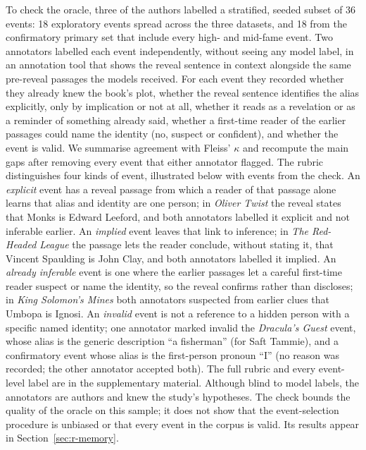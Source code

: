 \documentclass[sn-mathphys]{sn-jnl}%
\theoremstyle{thmstyleone}%
\theoremstyle{thmstyletwo}%
\theoremstyle{thmstylethree}%
\begin{document}
To check the oracle, three of the authors labelled a stratified, seeded subset of 36 events: 18 exploratory events spread across the three datasets, and 18 from the confirmatory primary set that include every high- and mid-fame event. Two annotators labelled each event independently, without seeing any model label, in an annotation tool that shows the reveal sentence in context alongside the same pre-reveal passages the models received. For each event they recorded whether they already knew the book's plot, whether the reveal sentence identifies the alias explicitly, only by implication or not at all, whether it reads as a revelation or as a reminder of something already said, whether a first-time reader of the earlier passages could name the identity (no, suspect or confident), and whether the event is valid. We summarise agreement with Fleiss' $\kappa$ \cite{fleiss1971measuring} and recompute the main gaps after removing every event that either annotator flagged. The rubric distinguishes four kinds of event, illustrated below with events from the check. An \emph{explicit} event has a reveal passage from which a reader of that passage alone learns that alias and identity are one person; in \emph{Oliver Twist} the reveal states that Monks is Edward Leeford, and both annotators labelled it explicit and not inferable earlier. An \emph{implied} event leaves that link to inference; in \emph{The Red-Headed League} the passage lets the reader conclude, without stating it, that Vincent Spaulding is John Clay, and both annotators labelled it implied. An \emph{already inferable} event is one where the earlier passages let a careful first-time reader suspect or name the identity, so the reveal confirms rather than discloses; in \emph{King Solomon's Mines} both annotators suspected from earlier clues that Umbopa is Ignosi. An \emph{invalid} event is not a reference to a hidden person with a specific named identity; one annotator marked invalid the \emph{Dracula's Guest} event, whose alias is the generic description ``a fisherman'' (for Saft Tammie), and a confirmatory event whose alias is the first-person pronoun ``I'' (no reason was recorded; the other annotator accepted both). The full rubric and every event-level label are in the supplementary material. Although blind to model labels, the annotators are authors and knew the study's hypotheses. The check bounds the quality of the oracle on this sample; it does not show that the event-selection procedure is unbiased or that every event in the corpus is valid. Its results appear in Section~\ref{sec:r-memory}.
\end{document}

